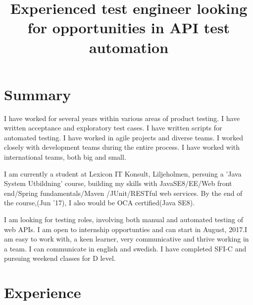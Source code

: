 \documentclass[12pt,a4paper,sans]{moderncv} %
\title{ Experienced test engineer looking for opportunities in API test automation}
\begin{document}
\makecvtitle

\section{Summary}
I have worked for several years within various areas of product testing. I have written acceptance and exploratory test cases. I have written scripts for automated testing. I have
worked in agile projects and diverse teams. I worked closely with development teams during the entire process. I have worked with international teams, both big and small.

\hfill \break
I am currently a student at Lexicon IT Konsult, Liljeholmen, persuing a 'Java System Utbildning' course, building my skills with JavaSE8/EE/Web front end/Spring fundamentals/Maven
/JUnit/RESTful web services. By the end of the course,(Jun '17), I also would be OCA certified(Java SE8).

\hfill \break
I am looking for testing roles, involving both manual and automated testing of web APIs. I am open to internship opportunties and can start in August, 2017.I am easy to work with,
a keen learner, very communicative and thrive working in a team. I can communicate in english and swedish.
I have completed SFI-C and pursuing weekend classes for D level.



\section{Experience}

\end{document}
